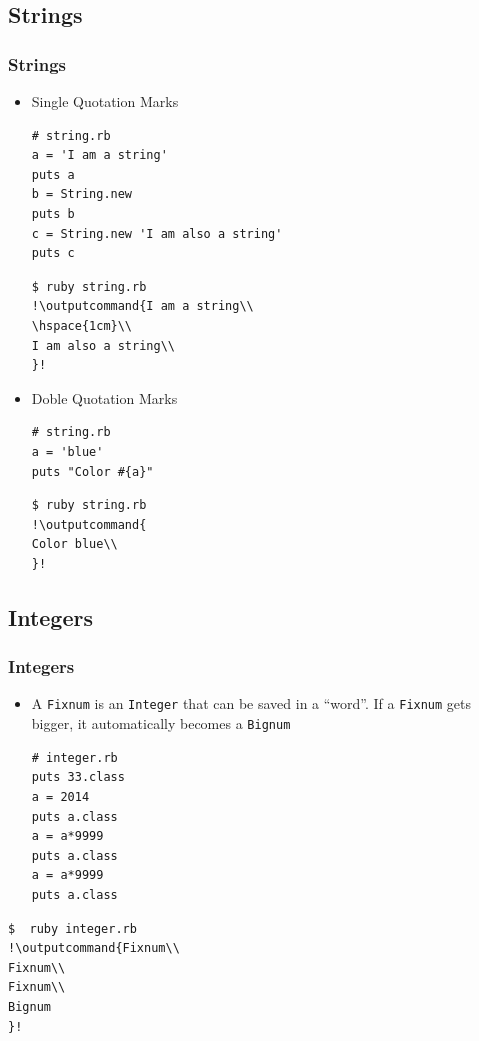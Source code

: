 \documentclass{beamer}
\newcommand{\outputcommand}[1]{\color{darkgreen}{#1}}
\begin{document}
\subsection{Strings}
\begin{frame}
\frametitle{Strings}
\begin{itemize}
 \item Single Quotation Marks
\lstset{language=Ruby, style=eclipse}
\begin{lstlisting}[escapechar=&]
# string.rb
a = 'I am a string'
puts a
b = String.new
puts b
c = String.new 'I am also a string'
puts c
\end{lstlisting}
\lstset{language=shell}
\begin{lstlisting}[numbers=none, escapechar=!]
$ ruby string.rb
!\outputcommand{I am a string\\
\hspace{1cm}\\
I am also a string\\
}!
\end{lstlisting}
 \item Doble Quotation Marks
\lstset{language=Ruby, style=eclipse}
\begin{lstlisting}[escapechar=&]
# string.rb
a = 'blue'
puts "Color #{a}"
\end{lstlisting}
\lstset{language=shell}
\begin{lstlisting}[numbers=none, escapechar=!]
$ ruby string.rb
!\outputcommand{
Color blue\\
}!
\end{lstlisting}

\end{itemize}
\end{frame}
\subsection{Integers}
\begin{frame}[fragile]
\frametitle{Integers}
\begin{itemize}
 \item A \texttt{Fixnum} is an \texttt{Integer} that can be saved in a ``word''. If a \texttt{Fixnum} gets bigger, it automatically becomes a \texttt{Bignum}
\lstset{language=Ruby, style=eclipse}
\begin{lstlisting}[escapechar=&]
# integer.rb
puts 33.class
a = 2014
puts a.class
a = a*9999
puts a.class
a = a*9999
puts a.class
\end{lstlisting}
\end{itemize}
\lstset{language=shell}
\begin{lstlisting}[numbers=none, escapechar=!]
$  ruby integer.rb 
!\outputcommand{Fixnum\\
Fixnum\\
Fixnum\\
Bignum
}!
\end{lstlisting}
\end{frame}
\end{document}
